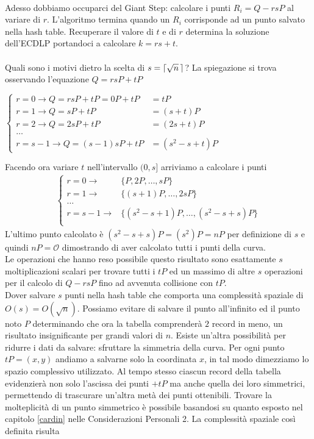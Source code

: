 \documentclass[a4paper,12pt]{tesiinfo}
\DeclarePairedDelimiter\ceil{\lceil}{\rceil}
\begin{document}
\\
Adesso dobbiamo occuparci del Giant Step: calcolare i punti $R_i=Q-rsP$ al variare di $r$. L'algoritmo termina quando un $R_i$ corrisponde ad un punto salvato nella hash table. Recuperare il valore di $t$ e di $r$ determina la soluzione dell'ECDLP portandoci a calcolare $k=rs+t$.
\\
\\
Quali sono i motivi dietro la scelta di $s = \ceil{\sqrt{n} \,}$? La spiegazione si trova osservando l'equazione $Q = rsP+tP$
\begin{center}
$\begin{cases}
 r = 0  \to Q=rsP+tP=0P+tP & =tP \\
 r = 1  \to Q=sP+tP & = (s+t)P \\
 r = 2  \to Q=2sP+tP &= (2s+t)P\\
 \ldots \\ 
 r = s-1  \to Q=(s-1)sP+tP &= (s^2-s+t)P
\end{cases}$
\end{center}
Facendo ora variare $t$ nell'intervallo $(0, s]$ arriviamo a calcolare i punti 
\begin{align*}
\begin{cases}
 r=0  \to & \{P, 2P, \ldots, sP\}\\
 r=1  \to & \{(s+1)P, \ldots, 2sP\}\\
 \ldots \\ 
 r=s-1  \to & \{(s^2-s+1)P, \ldots, (s^2-s+s)P\}\\
\end{cases}
\end{align*}
L'ultimo punto calcolato \`e $(s^2-s+s)P = (s^2)P = nP$ per definizione di $s$ e quindi $nP = \mathcal{O}$ dimostrando di aver calcolato tutti i punti della curva.
\\
Le operazioni che hanno reso possibile questo risultato sono esattamente $s$ moltiplicazioni scalari per trovare tutti i $tP$ ed un massimo di altre $s$ operazioni per il calcolo di $Q-rsP$ fino ad avvenuta collisione con $tP$.
\\
Dover salvare $s$ punti nella hash table che comporta una complessit\`a spaziale di $O(s) = O(\sqrt{n})$. Possiamo evitare di salvare il punto all'infinito ed il punto noto $P$ determinando che ora la tabella comprender\`a $2$ record in meno, un risultato insignificante per grandi valori di $n$. Esiste un'altra possibilit\`a per ridurre i dati da salvare: sfruttare la simmetria della curva. Per ogni punto $tP=(x, y)$ andiamo a salvarne solo la coordinata $x$, in tal modo dimezziamo lo spazio complessivo utilizzato. Al tempo stesso ciascun record della tabella evidenzier\`a non solo l'ascissa dei punti $+tP$ ma anche quella dei loro simmetrici, permettendo di trascurare un'altra met\`a dei punti ottenibili. Trovare la molteplicit\`a di un punto simmetrico \`e possibile basandosi su quanto esposto nel capitolo \ref{cardin} nelle Considerazioni Personali 2. La complessit\`a spaziale cos\`i definita risulta 
\end{document}
